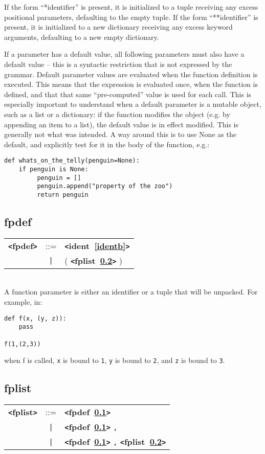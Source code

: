 \documentclass[12pt]{article}
\begin{document}
If the form ``*identifier'' is present, it is initialized to a tuple receiving 
any excess positional parameters, defaulting to the empty tuple. 
If the form ``**identifier'' is present, it is initialized to a new dictionary 
receiving any excess keyword arguments, defaulting to a new empty dictionary.

If a parameter has a default value, all following parameters must also have a 
default value -- this is a syntactic restriction that is not expressed by the grammar.   
Default parameter values are evaluated when the function definition is executed. 
This means that the expression is evaluated once, when the function is defined, 
and that that same ``pre-computed'' value is used for each call. This is especially 
important to understand when a default parameter is a mutable object, such as a list 
or a dictionary: if the function modifies the object (e.g. by appending an item to 
a list), the default value is in effect modified. This is generally not what was 
intended. A way around this is to use None as the default, and explicitly test for 
it in the body of the function, e.g.:
\begin{verbatim}
def whats_on_the_telly(penguin=None):
    if penguin is None:
         penguin = []    
         penguin.append("property of the zoo")    
         return penguin
\end{verbatim}

\subsection{fpdef}
\label{fpdefb}
\begin{tabular}{lcl}
{\bf \verb+<+fpdef\verb+>+} & ::=  & {\bf \verb+<+ident~\ref{identb}\verb+>+}  \\
 & \verb+|+  & ( {\bf \verb+<+fplist~\ref{fplistb}\verb+>+}  ) \\
\end{tabular} \\

A function parameter is either an identifier or a tuple that will be unpacked.  For example, in:
\begin{verbatim}
def f(x, (y, z)):
    pass

f(1,(2,3))
\end{verbatim}
when f is called, \verb|x| is bound to \verb|1|, \verb|y| is bound to \verb|2|, and
\verb|z| is bound to \verb|3|. \\

\subsection{fplist}
\label{fplistb}
\begin{tabular}{lcl}
{\bf \verb+<+fplist\verb+>+} & ::=  & {\bf \verb+<+fpdef~\ref{fpdefb}\verb+>+}  \\
 & \verb+|+  & {\bf \verb+<+fpdef~\ref{fpdefb}\verb+>+}  \verb|,| \\
 & \verb+|+  & {\bf \verb+<+fpdef~\ref{fpdefb}\verb+>+}  \verb|,| {\bf \verb+<+fplist~\ref{fplistb}\verb+>+}  \\
\end{tabular}
\end{document}
